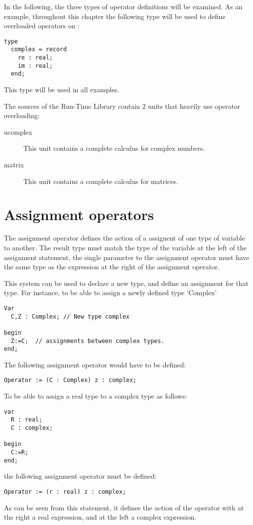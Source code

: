 In the following, the three types of operator definitions will be examined.
As an example, throughout this chapter the following type will be used to
define overloaded operators on :
\begin{verbatim}
type
  complex = record
    re : real;
    im : real;
  end;
\end{verbatim}
This type will be used in all examples.

The sources of the Run-Time Library contain 2 units that heavily use
operator overloading:
\begin{description}
\item[ucomplex] This unit contains a complete calculus for complex numbers.
\item[matrix] This unit contains a complete calculus for matrices.
\end{description}

\section{Assignment operators}
The assignment operator defines the action of a assignent of one type of
variable to another. The result type must match the type of the variable
at the left of the assignment statement, the single parameter to the
assignment operator must have the same type as the expression at the
right of the assignment operator.

This system can be used to declare a new type, and define an assignment for
that type. For instance, to be able to assign a newly defined type 'Complex'
\begin{verbatim}
Var
  C,Z : Complex; // New type complex

begin
  Z:=C;  // assignments between complex types.
end;
\end{verbatim}
The following assignment operator would have to be defined:
\begin{verbatim}
Operator := (C : Complex) z : complex;
\end{verbatim}

To be able to assign a real type to a complex type as follows:
\begin{verbatim}
var
  R : real;
  C : complex;

begin
  C:=R;
end;
\end{verbatim}
the following assignment operator must be defined:
\begin{verbatim}
Operator := (r : real) z : complex;
\end{verbatim}
As can be seen from this statement, it defines the action of the operator
\var{:=} with at the right a real expression, and at the left a complex
expression.

